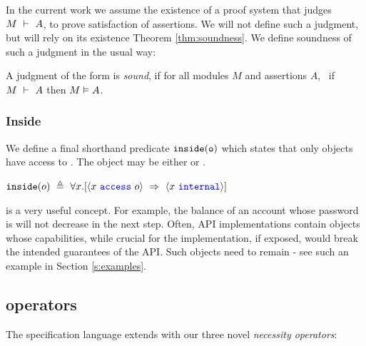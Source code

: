  
In the current work we assume the existence of a proof system that judges
$M\ \vdash\ A$, to prove  satisfaction of assertions. 
 We will not define such a judgment, but will rely on its existence  Theorem \ref{thm:soundness}.
We define soundness of such a judgment in the usual way:

\begin{definition}
\label{ax:specW-prove-soundness}
A judgment of the form  is \emph{sound}, if for all
 modules $M$ and assertions $A$, \ if $M\ \vdash\ A$ then $M \vDash A$.
\end{definition}

 
\subsubsection{Inside}

We define
a final shorthand 
predicate $\texttt{inside}( {\texttt{o}} )$ which states 
that only \internalO objects have access to .
The object  may be either \internalO or \externalO.
\begin{definition}[Inside]
$\wrapped{o}\ \triangleq\ \all{x}{\access{x}{o}\ \Rightarrow\ \internal{x}} $ 
\end{definition}

 
\inside is a very useful concept. For example, the balance of an account whose
  password is \inside  will not decrease in the next step.
  Often, API implementations contain objects whose capabilities, while  crucial for the implementation, if exposed,
would break the intended guarantees of the API. Such objects need to remain \inside - see
such an example in Section \ref{s:examples}. 
 


\subsection {\Nec operators}
\label{s:holistic-guarantees}

The \Nec specification language extends \SpecO with our three novel 
 \emph{necessity operators}:

